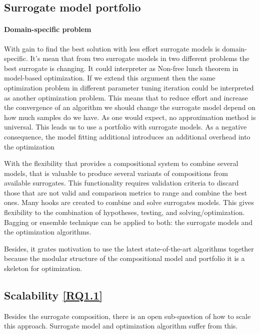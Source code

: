         
        \subsection{Surrogate model portfolio}

            \paragraph{Domain-specific problem} With gain to find the best solution with less effort surrogate models is domain-specific. It's mean that from two surrogate models in two different problems the best surrogate is changing. It could interpreter as Non-free lunch theorem in model-based optimization. If we extend this argument then the same optimization problem in different parameter tuning iteration could be interpreted as another optimization problem. This means that to reduce effort and increase the convergence of an algorithm we should change the surrogate model depend on how much samples do we have. As one would expect, no approximation method is universal. This leads us to use a portfolio with surrogate models. As a negative consequence, the model fitting additional introduces an additional overhead into the optimization

            With the flexibility that provides a compositional system to combine several models, that is valuable to produce several variants of compositions from available surrogates. This functionality requires validation criteria to discard those that are not valid and comparison metrics to range and combine the best ones. Many hooks are created to combine and solve surrogates models. This gives flexibility to the combination of hypotheses, testing, and solving/optimization. Bagging or ensemble technique can be applied to both: the surrogate models and the optimization algorithms.

            Besides, it grates motivation to use the latest state-of-the-art algorithms together because the modular structure of the compositional model and portfolio it is a skeleton for optimization. 


        \subsection{Scalability \ref{RQ1.1}}
            Besides the surrogate composition, there is an open sub-question of how to scale this approach. Surrogate model and optimization algorithm suffer from this.


